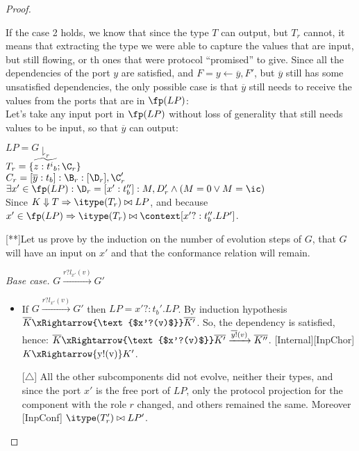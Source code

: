 \begin{proof}
\begin{itemize}
     
     If the case 2 holds, we know that since the type $T$ can output, but $T_r$ cannot, it means that extracting the type we were able to capture the values that are input, but still flowing, or th ones that were protocol ``promised'' to give. Since all the dependencies of the port $y$ are satisfied, and $F=y\leftarrow \overline{y},F'$, but $\overline{y}$ still has some unsatisfied dependencies, the only possible case is that $\overline{y}$ still needs to receive the values from the ports that are in $\fp(LP)$: \\
     
     Let's take any input port in $\fp(LP)$ without loss of generality that still needs values to be input, so that $\overline{y}$ can output:
     
     $LP=G\downharpoonright_r$\\
     $T_r=\{\widetilde{z:{t^i}_b};\C_r\}$\\
     $C_r=[\overline{y}:t_b]:\B_r:[\D_r],\C_r'$\\
     $\exists x'\in \fp(LP): \D_r=[x':t_b'']:M,D_r' \wedge (M=0 \lor M=\ic)$\\
     
     Since $K\Downarrow T\Rightarrow \itype(T_r)\bowtie LP$, and because $x'\in \fp(LP)\Rightarrow \itype(T_r)\bowtie \context[x'?:t_b''.LP']$.
     
     
     [**]Let us prove by the induction on the number of evolution steps of $G$, that $G$ will have  an input  on $x'$  and that the conformance relation will remain.
     
     
     
     \textit{Base case.}  $G\xrightarrow{\text{$r?l_{x'}(v)$}}G'$ \\
     
     \begin{itemize}
     
    \item If   $G\xrightarrow{\text{$r?l_{x'}(v)$}}G'$ then $LP=x'?:t_b'.LP$.
     By induction hypothesis $\overline{K}\xRightarrow{\text{$x'?(v)$}}\overline{K'}$.
     So, the dependency is satisfied, hence: $\overline{K}\xRightarrow{\text{$x'?(v)$}}\overline{K'}\xrightarrow{\text{$\overline{y!}(v)$}}\overline{K''}$.
     [Internal][InpChor] $K\xRightarrow{\text{y!(v)}}K'$.
     
     [$\triangle$] All the other subcomponents did not evolve, neither their types, and since the port $x'$ is the free port of $LP$, only the protocol projection for the component with the role $r$ changed, and others remained the same. Moreover [InpConf] $\itype(T_r')\bowtie LP'$.
     

\end{itemize}
\end{itemize}
\end{proof}
